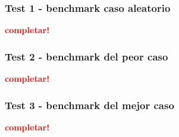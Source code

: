 \subsubsection{Test 1 - benchmark caso aleatorio}

\textcolor{red}{\textbf{completar!}}


\newpage
\subsubsection{Test 2 - benchmark del peor caso}

\textcolor{red}{\textbf{completar!}}


\newpage
\subsubsection{Test 3 - benchmark del mejor caso}

\textcolor{red}{\textbf{completar!}}
